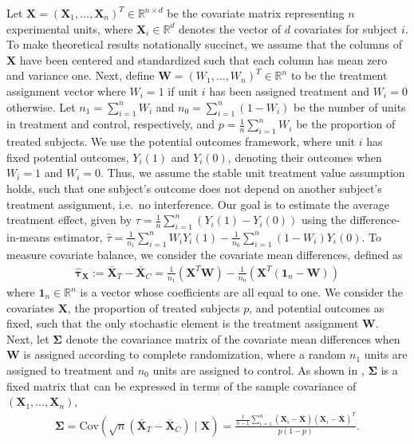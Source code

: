 \documentclass[11pt,twoside]{article}
\theoremstyle{definition}
\theoremstyle{remark}
\begin{document}
Let $\mathbf{X} = (\mathbf{X}_1, \ldots, \mathbf{X}_n)^T \in \mathbb{R}^{n \times d}$ be the covariate matrix representing $n$ experimental units, where $\mathbf{X}_i \in \mathbb{R}^d$ denotes the vector of $d$ covariates for subject $i$. To make theoretical results notationally succinct, we assume that the columns of $\mathbf{X}$ have been centered and standardized such that each column has mean zero and variance one. Next, define $\mathbf{W} = (W_1, \ldots, W_n)^T \in \mathbb{R}^n$ to be the treatment assignment vector where $W_i = 1$ if unit $i$ has been assigned treatment and $W_i = 0$ otherwise. Let $n_1 = \sum^n_{i=1} W_i$ and $n_0 = \sum^n_{i=1}(1 - W_i)$ be the number of units in treatment and control, respectively, and $p = \frac{1}{n}\sum^n_{i=1}W_i$ be the proportion of treated subjects. We use the potential outcomes framework, where unit $i$ has fixed potential outcomes, $Y_i(1)$ and $Y_i(0)$, denoting their outcomes when $W_i = 1$ and $W_i = 0$. Thus, we assume the stable unit treatment value assumption holds, such that one subject's outcome does not depend on another subject's treatment assignment, i.e.\ no interference. Our goal is to estimate the average treatment effect, given by $\tau = \frac{1}{n} \sum^n_{i=1} (Y_i(1) - Y_i(0))$ using the difference-in-means estimator, $\widehat{\tau} = \frac{1}{n_1} \sum^n_{i=1} W_i Y_i(1) - \frac{1}{n_0} \sum^n_{i=1} (1 - W_i) Y_i(0)$. To measure covariate balance, we consider the covariate mean differences, defined as
\begin{align*}
    \widehat{\bm{\tau}}_{\mathbf{X}} :=  \bar{\mathbf{X}}_T - \bar{\mathbf{X}}_C = \frac{1}{n_1} ( \mathbf{X}^T \mathbf{W} ) - \frac{1}{n_0} ( \mathbf{X}^T(\mathbf{1}_n - \mathbf{W}) )
\end{align*}
where $\mathbf{1}_n \in \mathbb{R}^n$ is a vector whose coefficients are all equal to one. We consider the covariates $\mathbf{X}$, the proportion of treated subjects $p$, and potential outcomes as fixed, such that the only stochastic element is the treatment assignment $\mathbf{W}$. Next, let $\mathbf{\Sigma}$ denote the covariance matrix of the covariate mean differences when $\mathbf{W}$ is assigned according to complete randomization, where a random $n_1$ units are assigned to treatment and $n_0$ units are assigned to control. As shown in \cite{morgan2012rerandomization}, $\mathbf{\Sigma}$ is a fixed matrix that can be expressed in terms of the sample covariance of $(\mathbf{X}_1, \ldots, \mathbf{X}_n)$, 
\begin{align*}
    \mathbf{\Sigma} = \text{Cov}\left(\sqrt{n}\left(\bar{\mathbf{X}}_T - \bar{\mathbf{X}}_C \right) \mid \mathbf{X}\right) = \frac{\frac{1}{n-1} \sum^n_{i=1} (\mathbf{X}_i - \bar{\mathbf{X}}) (\mathbf{X}_i - \bar{\mathbf{X}})^T}{p(1-p)}.
\end{align*}
\end{document}
